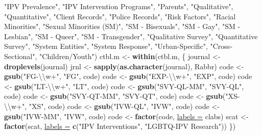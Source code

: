 \documentclass[]{tufte-handout}
\newenvironment{Shaded}{}{}
\newcommand{\KeywordTok}[1]{\textbf{{#1}}}
\newcommand{\DataTypeTok}[1]{\underline{{#1}}}
\newcommand{\CharTok}[1]{{#1}}
\newcommand{\StringTok}[1]{{#1}}
\newcommand{\NormalTok}[1]{{#1}}
\begin{document}
\begin{Shaded}
\begin{Highlighting}[]
    \StringTok{"IPV Prevalence"}\NormalTok{, }\StringTok{"IPV Intervention Programs"}\NormalTok{, }\StringTok{"Parents"}\NormalTok{, }
    \StringTok{"Qualitative"}\NormalTok{, }\StringTok{"Quantitative"}\NormalTok{, }\StringTok{"Client Records"}\NormalTok{, }\StringTok{"Police Records"}\NormalTok{, }
    \StringTok{"Risk Factors"}\NormalTok{, }\StringTok{"Racial Minorities"}\NormalTok{, }\StringTok{"Sexual Minorities (SM)"}\NormalTok{, }
    \StringTok{"SM - Bisexuals"}\NormalTok{, }\StringTok{"SM - Gay"}\NormalTok{, }\StringTok{"SM - Lesbian"}\NormalTok{, }\StringTok{"SM - Queer"}\NormalTok{, }
    \StringTok{"SM - Transgender"}\NormalTok{, }\StringTok{"Qualitative Survey"}\NormalTok{, }\StringTok{"Quantitative Survey"}\NormalTok{, }
    \StringTok{"System Entities"}\NormalTok{, }\StringTok{"System Response"}\NormalTok{, }\StringTok{"Urban-Specific"}\NormalTok{, }\StringTok{"Cross-Sectional"}\NormalTok{, }
    \StringTok{"Children/Youth"}\NormalTok{)}
\NormalTok{ctbl.m <-}\StringTok{ }\KeywordTok{within}\NormalTok{(ctbl.m, \{}
    \NormalTok{journal <-}\StringTok{ }\KeywordTok{droplevels}\NormalTok{(journal)}
    \NormalTok{jrnl <-}\StringTok{ }\KeywordTok{sapply}\NormalTok{(}\KeywordTok{as.character}\NormalTok{(journal), Rabbr)}
    \NormalTok{code <-}\StringTok{ }\KeywordTok{gsub}\NormalTok{(}\StringTok{"FG-}\CharTok{\textbackslash{}\textbackslash{}}\StringTok{w+"}\NormalTok{, }\StringTok{"FG"}\NormalTok{, code)}
    \NormalTok{code <-}\StringTok{ }\KeywordTok{gsub}\NormalTok{(}\StringTok{"EXP-}\CharTok{\textbackslash{}\textbackslash{}}\StringTok{w+"}\NormalTok{, }\StringTok{"EXP"}\NormalTok{, code)}
    \NormalTok{code <-}\StringTok{ }\KeywordTok{gsub}\NormalTok{(}\StringTok{"LT-}\CharTok{\textbackslash{}\textbackslash{}}\StringTok{w+"}\NormalTok{, }\StringTok{"LT"}\NormalTok{, code)}
    \NormalTok{code <-}\StringTok{ }\KeywordTok{gsub}\NormalTok{(}\StringTok{"SVY-QL-MM"}\NormalTok{, }\StringTok{"SVY-QL"}\NormalTok{, code)}
    \NormalTok{code <-}\StringTok{ }\KeywordTok{gsub}\NormalTok{(}\StringTok{"SVY-QT-MM"}\NormalTok{, }\StringTok{"SVY-QT"}\NormalTok{, code)}
    \NormalTok{code <-}\StringTok{ }\KeywordTok{gsub}\NormalTok{(}\StringTok{"XS-}\CharTok{\textbackslash{}\textbackslash{}}\StringTok{w+"}\NormalTok{, }\StringTok{"XS"}\NormalTok{, code)}
    \NormalTok{code <-}\StringTok{ }\KeywordTok{gsub}\NormalTok{(}\StringTok{"IVW-QL"}\NormalTok{, }\StringTok{"IVW"}\NormalTok{, code)}
    \NormalTok{code <-}\StringTok{ }\KeywordTok{gsub}\NormalTok{(}\StringTok{"IVW-MM"}\NormalTok{, }\StringTok{"IVW"}\NormalTok{, code)}
    \NormalTok{code <-}\StringTok{ }\KeywordTok{factor}\NormalTok{(code, }\DataTypeTok{labels =} \NormalTok{clabs)}
    \NormalTok{scat <-}\StringTok{ }\KeywordTok{factor}\NormalTok{(scat, }\DataTypeTok{labels =} \KeywordTok{c}\NormalTok{(}\StringTok{"IPV Interventions"}\NormalTok{, }\StringTok{"LGBTQ-IPV Research"}\NormalTok{))}
\NormalTok{\})}
\end{Highlighting}
\end{Shaded}
\end{document}
